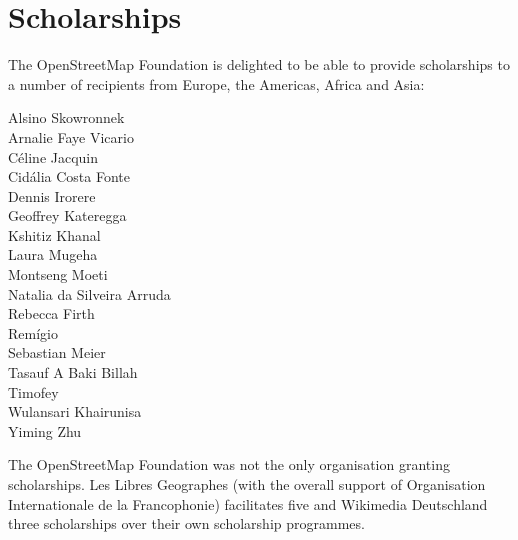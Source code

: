 \newpage
\section*{Scholarships}
\label{scholarships}
\pagestyle{cropmarksstyle}

The OpenStreetMap Foundation is delighted to be able to provide scholarships to a number of
recipients from Europe, the Americas, Africa and Asia:

\RaggedRight
\begin{multicols}{2}
  Alsino Skowronnek\\
  Arnalie Faye Vicario\\
  Céline Jacquin\\
  Cidália Costa Fonte\\
  Dennis Irorere\\
  Geoffrey Kateregga\\
  Kshitiz Khanal\\
  Laura Mugeha\\
  Montseng Moeti\\
  Natalia da Silveira Arruda\\
  Rebecca Firth\\
  Remígio\\
  Sebastian Meier\\
  Tasauf A Baki Billah\\
  Timofey\\
  Wulansari Khairunisa\\
  Yiming Zhu\\
\end{multicols}
\justifying

The OpenStreetMap Foundation was not the only organisation granting scholarships. Les Libres
Geographes (with the overall support of Organisation Internationale de la Francophonie) facilitates five and Wikimedia Deutschland three scholarships over their own scholarship programmes.
